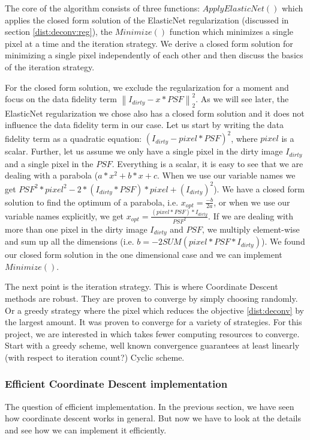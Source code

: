 The core of the algorithm consists of three functions: $ApplyElasticNet()$ which applies the closed form solution of the ElasticNet regularization (discussed in section \ref{dist:deconv:reg}), the $Minimize()$ function which minimizes a single pixel at a time and the iteration strategy. We derive a closed form solution for minimizing a single pixel independently of each other and then discuss the basics of the iteration strategy.

For the closed form solution, we exclude the regularization for a moment and focus on the data fidelity term $\left \| I_{dirty} - x * PSF \right \|_2^2$. As we will see later, the ElasticNet regularization we chose also has a closed form solution and it does not influence the data fidelity term in our case. Let us start by writing the data fidelity term as a quadratic equation: $(I_{dirty} - pixel * PSF)^2$, where $pixel$ is a scalar. Further, let us assume we only have a single pixel in the dirty image $I_{dirty}$ and a single pixel in the $PSF$. Everything is a scalar, it is easy to see that we are dealing with a parabola ($a*x^2 + b*x + c$. When we use our variable names we get $PSF^2 * pixel^2 - 2*(I_{dirty}*PSF)*pixel + (I_{dirty})^2$). We have a closed form solution to find the optimum of a parabola, i.e. $x_{opt} = \frac{-b}{2a}$, or when we use our variable names explicitly, we get $x_{opt} = \frac{(pixel*PSF)*I_{dirty}}{PSF^2}$. If we are dealing with more than one pixel in the dirty image $I_{dirty}$ and $PSF$, we multiply element-wise and sum up all the dimensions (i.e. $b = -2 SUM(pixel*PSF*I_{dirty})$). We found our closed form solution in the one dimensional case and we can implement $Minimize()$.

The next point is the iteration strategy. This is where Coordinate Descent methods are robust. They are proven to converge by simply choosing randomly. Or a greedy strategy where the pixel which reduces the objective \eqref{dist:deconv} by the largest amount. It was proven to converge for a variety of strategies. For this project, we are interested in which takes fewer computing resources to converge. 
Start with a greedy scheme, well known convergence guarantees at least linearly (with respect to iteration count?)\cite{luo1992convergence}
Cyclic scheme.

\subsubsection{Efficient Coordinate Descent implementation}\label{dist:deconv:efficient}
The question of efficient implementation. In the previous section, we have seen how coordinate descent works in general. But now we have to look at the details and see how we can implement it efficiently.

